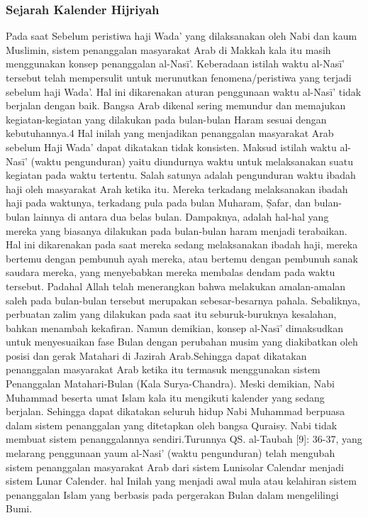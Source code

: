     \subsubsection{Sejarah Kalender Hijriyah}\cite{setyanto2015kriteria}
      Pada saat Sebelum peristiwa haji Wada’ yang dilaksanakan oleh Nabi dan kaum Muslimin, sistem penanggalan masyarakat Arab di Makkah kala itu masih menggunakan konsep penanggalan al-Nasī’. Keberadaan istilah waktu al-Nasī’ tersebut telah mempersulit untuk merunutkan fenomena/peristiwa yang terjadi sebelum haji Wada’.
    Hal ini dikarenakan aturan penggunaan waktu al-Nasī’ tidak berjalan dengan baik. Bangsa Arab dikenal sering memundur dan memajukan kegiatan-kegiatan yang dilakukan pada bulan-bulan Haram sesuai dengan kebutuhannya.4 Hal inilah yang menjadikan penanggalan masyarakat Arab sebelum Haji Wada’ dapat dikatakan tidak konsisten.
    Maksud istilah waktu al-Nasī’ (waktu pengunduran) yaitu diundurnya waktu untuk melaksanakan suatu kegiatan pada waktu tertentu. Salah satunya adalah pengunduran waktu ibadah haji oleh masyarakat Arah ketika itu. Mereka terkadang melaksanakan ibadah haji pada waktunya, terkadang pula pada bulan Muharam, Ṣafar, dan bulan-bulan lainnya di antara dua belas bulan.
    Dampaknya, adalah hal-hal yang mereka yang biasanya dilakukan pada bulan-bulan haram menjadi terabaikan. Hal ini dikarenakan pada saat mereka sedang melaksanakan ibadah haji, mereka bertemu dengan pembunuh ayah mereka, atau bertemu dengan pembunuh sanak saudara mereka, yang menyebabkan mereka membalas dendam pada waktu tersebut.
    Padahal Allah telah menerangkan bahwa melakukan amalan-amalan saleh pada bulan-bulan tersebut merupakan sebesar-besarnya pahala. Sebaliknya, perbuatan zalim yang dilakukan pada saat itu seburuk-buruknya kesalahan, bahkan menambah kekafiran.
    Namun demikian, konsep al-Nasī’ dimaksudkan untuk menyesuaikan fase Bulan dengan perubahan musim yang diakibatkan oleh posisi dan gerak Matahari di Jazirah Arab.Sehingga dapat dikatakan penanggalan masyarakat Arab ketika itu termasuk menggunakan sistem Penanggalan Matahari-Bulan (Kala Surya-Chandra).
    Meski demikian, Nabi Muhammad beserta umat Islam kala itu mengikuti kalender yang sedang berjalan. Sehingga dapat dikatakan seluruh hidup Nabi Muhammad berpuasa dalam sistem penanggalan yang ditetapkan oleh bangsa Quraisy. Nabi tidak membuat sistem penanggalannya sendiri.Turunnya QS.
    al-Taubah [9]: 36-37, yang melarang penggunaan yaum al-Nasi’ (waktu pengunduran) telah mengubah sistem penanggalan masyarakat Arab dari sistem Lunisolar Calendar menjadi sistem Lunar Calender. hal Inilah yang menjadi awal mula atau kelahiran sistem penanggalan Islam yang berbasis pada pergerakan Bulan dalam mengelilingi Bumi.
